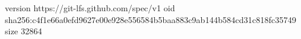 version https://git-lfs.github.com/spec/v1
oid sha256:c4f1e66a0efd9627e00e928e556584b5baa883c9ab144b584cd31c818fc35749
size 32864
